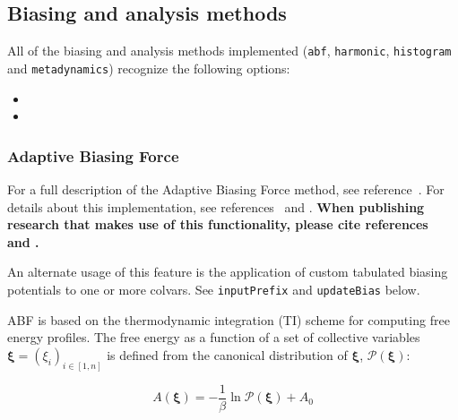 \subsection{Biasing and analysis methods}
\label{sec:colvarbias}

All of the biasing and analysis methods implemented (\texttt{abf},
\texttt{harmonic}, \texttt{histogram} and \texttt{metadynamics})
recognize the following options:
\begin{itemize}

\item %

\item %

\end{itemize}


\subsubsection{Adaptive Biasing Force}
\label{sec:colvarbias_abf}

For a full description of the Adaptive Biasing Force method, see
reference~\cite{Darve2008}. For details about this implementation,
see references~\cite{Henin2004} and \cite{Henin2010}. \textbf{When
publishing research that makes use of this functionality, please cite
references~\cite{Darve2008} and \cite{Henin2010}.}

An alternate usage of this feature is the application of custom
tabulated biasing potentials to one or more colvars. See
\texttt{inputPrefix} and \texttt{updateBias} below.

ABF is based on the thermodynamic integration (TI) scheme for
computing free energy profiles. The free energy as a function
of a set of collective variables $\bm{\xi}=(\xi_{i})_{i\in[1,n]}$
is defined from the canonical distribution of $\bm{\xi}$, ${\mathcal P}(\bm{\xi})$:

\begin{equation}
  \label{eq:free}
  A(\bm{\xi}) = -\frac{1}{\beta} \ln {\mathcal P}(\bm{\xi}) + A_0
\end{equation}

